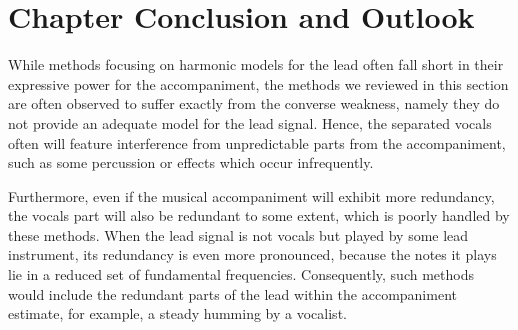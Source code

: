 \section{Chapter Conclusion and Outlook}

While methods focusing on harmonic models for the lead often fall short in their expressive power for the accompaniment, the methods we reviewed in this section are often observed to suffer exactly from the converse weakness, namely they do not provide an adequate model for the lead signal. Hence, the separated vocals often will feature interference from unpredictable parts from the accompaniment, such as some percussion or effects which occur infrequently.

Furthermore, even if the musical accompaniment will exhibit more redundancy, the vocals part will also be redundant to some extent, which is poorly handled by these methods. When the lead signal is not vocals but played by some lead instrument, its redundancy is even more pronounced, because the notes it plays lie in a reduced set of fundamental frequencies. Consequently, such methods would include the redundant parts of the lead within the accompaniment estimate, for example, a steady humming by a vocalist.
